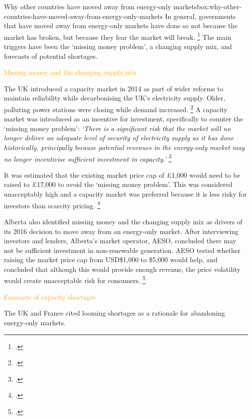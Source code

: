 \documentclass[FrontPage]{grattan}
\newenvironment{alphafootnotes}{}{}
\begin{document}
\begin{bigbox*}{Why other countries have moved away from energy-only markets}{box:why-other-countries-have-moved-away-from-energy-only-markets}
\setlength{\parskip}{6pt}
\setlength{\intextsep}{6pt}
\begin{alphafootnotes}
In general, governments that have moved away from energy-only markets have done so not because the market has broken, but because they fear the market will break.%
\footcite{CIGRE2016CapacityMechanisms}
The main triggers have been the `missing money problem', a changing supply mix, and forecasts of potential shortages.

\textcolor{Orange}{Missing money and the changing supply mix}

The UK introduced a capacity market in 2014 as part of wider reforms to maintain reliability while decarbonising the UK's electricity supply. Older, polluting power stations were closing while demand increased.%
\footcites{Ofgem2017EMR}{DECC2014EMR}
A capacity market was introduced as an incentive for investment, specifically to counter the `missing money problem':
\emph{`There is a significant risk that the market will no longer deliver an adequate level of security of electricity supply as it has done historically, principally because potential revenues in the energy-only market may no longer incentivise sufficient investment in capacity.'}
\footcite[][1]{DECC2014EMRCapacityImpactAssessment}

It was estimated that the existing market price cap of £1,000 would need to be raised to £17,000 to avoid the `missing money problem'. This was considered unacceptably high and a capacity market was preferred because it is less risky for investors than scarcity pricing.%
\footcite[][59]{DECC2014EMRCapacityImpactAssessment}

Alberta also identified missing money and the changing supply mix as drivers of its 2016 decision to move away from an energy-only market. After interviewing investors and lenders, Alberta's market operator, AESO, concluded there may not be sufficient investment in non-renewable generation. AESO tested whether raising the market price cap from USD\$1,000 to \$5,000 would help, and concluded that although this would provide enough revenue, the price volatility would create unacceptable risk for consumers.%
\footcite{AESO2016AlbertaMarketReform}

\textcolor{Orange}{Forecasts of capacity shortages}

The UK and France cited looming shortages as a rationale for abandoning energy-only markets.


\end{alphafootnotes}
\end{bigbox*}
\end{document}
